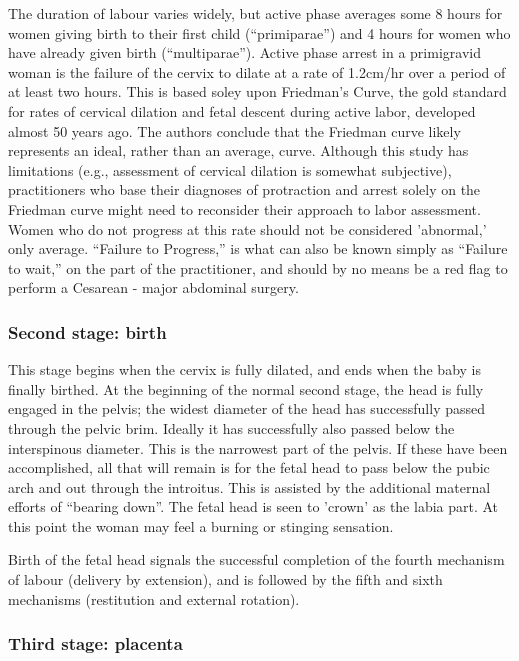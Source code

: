 \documentclass[12pt,a4paper,onecolumn]{article}
\begin{document}
The duration of labour varies widely, but active phase averages some 8 hours for women giving birth
to their first child (``primiparae'') and 4 hours for women who have already given birth
(``multiparae''). Active phase arrest in a primigravid woman is the failure of the cervix to dilate
at a rate of 1.2cm/hr over a period of at least two hours. This is based soley upon Friedman's
Curve, the gold standard for rates of cervical dilation and fetal descent during active labor,
developed almost 50 years ago. The authors conclude that the Friedman curve likely represents an
ideal, rather than an average, curve. Although this study has limitations (e.g., assessment of
cervical dilation is somewhat subjective), practitioners who base their diagnoses of protraction and
arrest solely on the Friedman curve might need to reconsider their approach to labor assessment.
Women who do not progress at this rate should not be considered 'abnormal,' only average. ``Failure
to Progress,'' is what can also be known simply as ``Failure to wait,'' on the part of the
practitioner, and should by no means be a red flag to perform a Cesarean - major abdominal surgery.

\subsubsection{Second stage: birth}

This stage begins when the cervix is fully dilated, and ends when the baby is finally birthed. At
the beginning of the normal second stage, the head is fully engaged in the pelvis; the widest
diameter of the head has successfully passed through the pelvic brim. Ideally it has successfully
also passed below the interspinous diameter. This is the narrowest part of the pelvis. If these have
been accomplished, all that will remain is for the fetal head to pass below the pubic arch and out
through the introitus. This is assisted by the additional maternal efforts of ``bearing down''. The
fetal head is seen to 'crown' as the labia part. At this point the woman may feel a burning or
stinging sensation.

Birth of the fetal head signals the successful completion of the fourth mechanism of labour
(delivery by extension), and is followed by the fifth and sixth mechanisms (restitution and external
rotation).

\subsubsection{Third stage: placenta}
\end{document}
